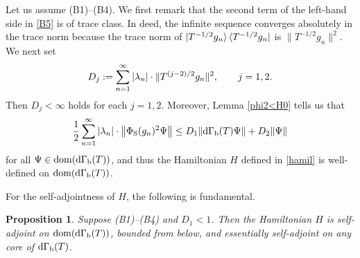 \documentclass[12pt]{article}
\theoremstyle{plain}
\newtheorem{prop}[theorem]{\bf Proposition}
\numberwithin{equation}{section}
\theoremstyle{remark}
\begin{document}
Let us assume (B1)--(B4).
We first remark that the second term of the left-hand side in \eqref{B5} is of trace class.
In deed, the infinite sequence converges absolutely in the trace norm because the trace norm of $\ket{T^{-1/2}g_n} \bra{T^{-1/2}g_n}$ is $\|T^{-1/2}g_n\|^2$.
We next set
\begin{equation*}
 D_j := \sum_{n=1}^\infty |\lambda_n|\cdot\| T^{(j-2)/2}g_n \|^2, \qquad j=1,2.
\end{equation*}
Then $D_j<\infty$ holds for each $j=1,2$.
Moreover, Lemma \ref{phi2<H0} tells us that
\begin{equation}\label{aiueo2}
 \frac{1}{2}\sum_{n=1}^\infty|\lambda_n|\cdot\big\| \Phi_\mathrm{S}(g_n)^2\Psi \big\|
 \leq D_1 \| \mathrm{d\Gamma_b}(T)\Psi \| + D_2\| \Psi \|
\end{equation}
for all $\Psi\in\mathop{\mathrm{dom}}(\mathrm{d\Gamma_b}(T))$, and thus the Hamiltonian $H$ defined in \eqref{hamil} is well-defined on $\mathop{\mathrm{dom}}(\mathrm{d\Gamma_b}(T))$.

For the self-adjointness of $H$, the following is fundamental.





\begin{comment}
By Lemma \ref{phi2<H0}, $V_N(\dGb(T)+1)^{-1}$ is bounded and 
\begin{align}
  \norm{(V_N-V_{N'})(\dGb(T)+1)^{-1}} 
 &\leq \sum_{n=N'+1}^N \frac{|\lambda_n|}{2}\norm{\PhiS(g_n)^2(\dGb(T)+1)^{-1}} \notag \\
 &\leq \sum_{n=N'+1}^N |\lambda_n| \big( \norm{T^{-1/2}g_n}^2 + \norm{g_n}^2\big)
\end{align}
for $N>N'>0$. The right-hand side converges to zero as $N,N'\to\infty$ by assumption (B3) and (B4).
Hence $\sum_{n=1}^\infty\lambda_n\PhiS(g_n)^2(\dGb(T)+1)^{-1}$ is a bounded operator, and the limit
\begin{align*}
 V  := \lim_{N\to\infty} V_N  = \frac{1}{2} \sum_{n=1}^\infty \lambda_n \PhiS(g_n)^2 
\end{align*}
exists on $\dom(\dGb(T))$.
Thus, by assuming (B1)--(B4), the limit in \eqref{hamil} converges, 
and $H$ is certainly defined on $\dom(\dGb(T))$.
\end{comment}

\begin{prop}{\label{saH1}}
  Suppose (B1)--(B4) and $D_1<1$.
 Then the Hamiltonian $H$ is self-adjoint on $\mathop{\mathrm{dom}}(\mathrm{d\Gamma_b}(T))$, bounded from below,
and essentially self-adjoint on any core of $\mathrm{d\Gamma_b}(T)$.
\end{prop}
\end{document}

